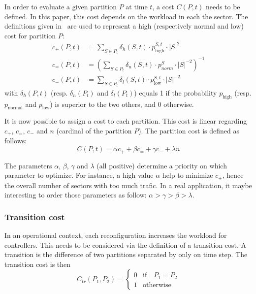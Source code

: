 \documentclass[oneside,twocolumn]{article}
\begin{document}
In order to evaluate a given partition $P$ at time $t$, a cost $C(P, t)$ needs
to be defined. In this paper, this cost depends on the workload in each the
sector. The definitions given in~\cite{ferrari2017} are used to represent a high
(respectively normal and low) cost for partition \(P\):
\begin{equation}
  \begin{aligned}
    c_+(P, t) &= \sum_{S \in P_t} \delta_{h}(S, t) \cdot p_\text{high}^{S, t} \cdot |S|^2\\
    c_=(P, t) &= \left(
    \sum_{S \in P_t} \delta_{n}(S, t) \cdot p_{norm}^{S} \cdot |S|^{-2}
    \right)^{-1}\\
    c_-(P, t) &= \sum_{S \in P_t} \delta_{l}(S, t) \cdot p_\text{low}^{S, t} \cdot |S|^{-2}
  \end{aligned}
\end{equation}
with $\delta_{h}(P, t)$ (resp. $\delta_{n}(P_t)$ and $\delta_{l}(P_t)$) equals 1
if the probability $p_\text{high}$ (resp. $p_\text{normal}$ and $p_\text{low}$) is superior to
the two others, and 0 otherwise.

It is now possible to assign a cost to each partition. This cost is linear
regarding $c_+$, $c_=$, $c_-$ and $n$ (cardinal of the partition $P$). The
partition cost is defined as follows:
\begin{equation}
  C(P, t) = \alpha c_+ + \beta c_= + \gamma c_- +\lambda n
\end{equation}

The parameters $\alpha$, $\beta$, $\gamma$ and $\lambda$ (all positive)
determine a priority on which parameter to optimize. For instance, a high
value $\alpha$ help to
minimize $c_+$, hence the overall number of sectors with too much trafic.
In a real application, it maybe interesting to order those parameters as
follow: $\alpha > \gamma > \beta > \lambda$.

\subsubsection{Transition cost}

In an operational context, each reconfiguration increases the workload for
controllers. This needs to be considered via the definition of a transition
cost.
A transition is the difference of two partitions separated by only on time step.
The transition cost is then
\begin{equation}
  C_{tr}(P_1, P_2) =
  \begin{cases}
    0 & \text{if} \quad P_1 = P_2\\
    1 & \text{otherwise}
  \end{cases}
\end{equation}
\end{document}
